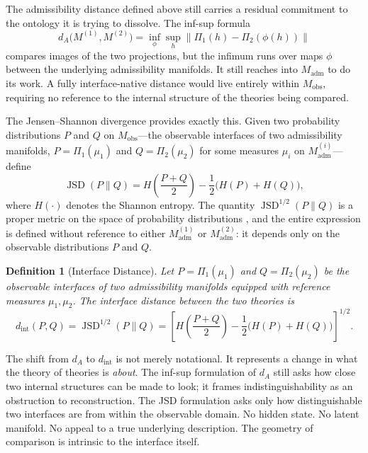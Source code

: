 \documentclass[12pt,a4paper]{article}
\newtheorem{definition}[theorem]{Definition}
\theoremstyle{remark}
\begin{document}
The admissibility distance defined above still carries a residual commitment
to the ontology it is trying to dissolve. The inf-sup formula
\[
  d_A\!\bigl(M^{(1)}, M^{(2)}\bigr)
  = \inf_\phi \sup_h \bigl\|\Pi_1(h) - \Pi_2(\phi(h))\bigr\|
\]
compares images of the two projections, but the infimum runs over maps
$\phi$ between the underlying admissibility manifolds. It still reaches
into $M_{\mathrm{adm}}$ to do its work. A fully interface-native distance
would live entirely within $M_{\mathrm{obs}}$, requiring no reference to
the internal structure of the theories being compared.

The Jensen--Shannon divergence provides exactly this. Given two probability
distributions $P$ and $Q$ on $M_{\mathrm{obs}}$---the observable interfaces
of two admissibility manifolds, $P = \Pi_1(\mu_1)$ and $Q = \Pi_2(\mu_2)$
for some measures $\mu_i$ on $M_{\mathrm{adm}}^{(i)}$---define
\begin{equation}
  \operatorname{JSD}(P\|Q)
  = H\!\left(\frac{P+Q}{2}\right)
    - \frac{1}{2}\bigl(H(P) + H(Q)\bigr),
  \label{eq:jsd}
\end{equation}
where $H(\cdot)$ denotes the Shannon entropy. The quantity
$\operatorname{JSD}^{1/2}(P\|Q)$ is a proper metric on the space of
probability distributions \cite{endres2003}, and the entire expression is
defined without reference to either $M_{\mathrm{adm}}^{(1)}$ or
$M_{\mathrm{adm}}^{(2)}$: it depends only on the observable distributions
$P$ and $Q$.

\begin{definition}[Interface Distance]
Let $P = \Pi_1(\mu_1)$ and $Q = \Pi_2(\mu_2)$ be the observable interfaces
of two admissibility manifolds equipped with reference measures
$\mu_1, \mu_2$. The \emph{interface distance} between the two theories is
\begin{equation}
  d_{\mathrm{int}}(P, Q)
  = \operatorname{JSD}^{1/2}(P\|Q)
  = \left[
      H\!\left(\frac{P+Q}{2}\right)
      - \frac{1}{2}\bigl(H(P) + H(Q)\bigr)
    \right]^{1/2}.
  \label{eq:interface_distance}
\end{equation}
\end{definition}

The shift from $d_A$ to $d_{\mathrm{int}}$ is not merely notational. It
represents a change in what the theory of theories is \emph{about}. The
inf-sup formulation of $d_A$ still asks how close two internal structures
can be made to look; it frames indistinguishability as an obstruction to
reconstruction. The JSD formulation asks only how distinguishable two
interfaces are from within the observable domain. No hidden state. No
latent manifold. No appeal to a true underlying description. The geometry
of comparison is intrinsic to the interface itself.
\end{document}
